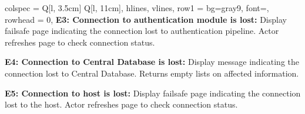 \begin{longtblr}[
  caption = {UC 4.5: Monitor system statistics},
]{
  colspec = {Q[l, 3.5cm] Q[l, 11cm]}, 
  hlines, vlines,
  row{1} = {bg=gray9, font=\bfseries}, 
  rowhead = 0, 
}
\textbf{E3: Connection to authentication module is lost:} Display failsafe page indicating the connection lost to authentication pipeline. Actor refreshes page to check connection status. \par \vspace{0.5em}
\textbf{E4: Connection to Central Database is lost:} Display message indicating the connection lost to Central Database. Returns empty lists on affected information. \par \vspace{0.5em}
\textbf{E5: Connection to host is lost:} Display failsafe page indicating the connection lost to the host. Actor refreshes page to check connection status. \\
\end{longtblr}